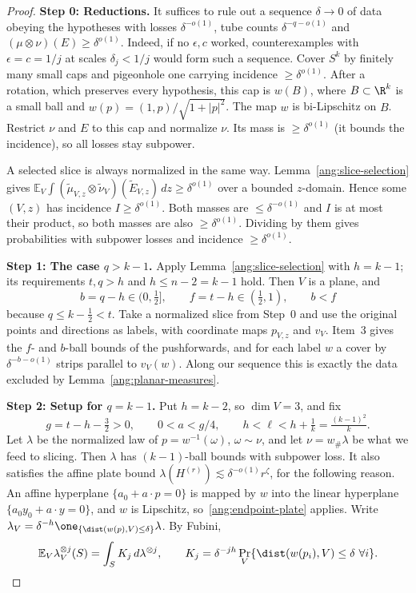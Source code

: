\documentclass[11pt,reqno]{amsart}
\begin{document}
\begin{proof}
\textbf{Step 0: Reductions.} It suffices to rule out a sequence $\delta\to0$ of data obeying the hypotheses with losses $\delta^{-o(1)}$, tube counts $\delta^{-q-o(1)}$ and $(\mu\otimes\nu)(E)\ge\delta^{o(1)}$. Indeed, if no $\epsilon,c$ worked, counterexamples with $\epsilon=c=1/j$ at scales $\delta_j<1/j$ would form such a sequence. Cover $S^k$ by finitely many small caps and pigeonhole one carrying incidence $\ge\delta^{o(1)}$. After a rotation, which preserves every hypothesis, this cap is $w(B)$, where $B\subset\R^k$ is a small ball and $w(p)=(1,p)/\sqrt{1+|p|^2}$. The map $w$ is bi-Lipschitz on $B$. Restrict $\nu$ and $E$ to this cap and normalize $\nu$. Its mass is $\ge\delta^{o(1)}$ (it bounds the incidence), so all losses stay subpower.

A selected slice is always normalized in the same way. Lemma~\ref{ang:slice-selection} gives $\mathbb E_V\int(\widetilde\mu_{V,z}\otimes\widetilde\nu_V)(\widetilde E_{V,z})\,dz\ge\delta^{o(1)}$ over a bounded $z$-domain. Hence some $(V,z)$ has incidence $I\ge\delta^{o(1)}$. Both masses are $\le\delta^{-o(1)}$ and $I$ is at most their product, so both masses are also $\ge\delta^{o(1)}$. Dividing by them gives probabilities with subpower losses and incidence $\ge\delta^{o(1)}$.

\textbf{Step 1: The case $q>k-1$.} Apply Lemma~\ref{ang:slice-selection} with $h=k-1$; its requirements $t,q>h$ and $h\le n-2=k-1$ hold. Then $V$ is a plane, and
\[
 b=q-h\in(0,\tfrac12],\qquad f=t-h\in(\tfrac12,1),\qquad b<f
\]
because $q\le k-\tfrac12<t$. Take a normalized slice from Step~0 and use the original points and directions as labels, with coordinate maps $p_{V,z}$ and $v_V$. Item~3 gives the $f$- and $b$-ball bounds of the pushforwards, and for each label $w$ a cover by $\delta^{-b-o(1)}$ strips parallel to $v_V(w)$. Along our sequence this is exactly the data excluded by Lemma~\ref{ang:planar-measures}.

\textbf{Step 2: Setup for $q=k-1$.} Put $h=k-2$, so $\dim V=3$, and fix
\[
 g=t-h-\tfrac32>0,\qquad 0<a<g/4,\qquad h<\ell<h+\tfrac1k=\tfrac{(k-1)^2}{k}.
\]
Let $\lambda$ be the normalized law of $p=w^{-1}(\omega)$, $\omega\sim\nu$, and let $\nu=w_\#\lambda$ be what we feed to slicing. Then $\lambda$ has $(k-1)$-ball bounds with subpower loss. It also satisfies the affine plate bound $\lambda(H^{(r)})\lesssim\delta^{-o(1)}r^\zeta$, for the following reason. An affine hyperplane $\{a_0+a\cdot p=0\}$ is mapped by $w$ into the linear hyperplane $\{a_0y_0+a\cdot y=0\}$, and $w$ is Lipschitz, so~\eqref{ang:endpoint-plate} applies. Write $\lambda_V=\delta^{-h}\one_{\{\dist(w(p),V)\le\delta\}}\lambda$. By Fubini,
\[
 \mathbb E_V\lambda_V^{\otimes j}(S)=\int_S K_j\,d\lambda^{\otimes j},\qquad
 K_j=\delta^{-jh}\Pr_V\{\dist(w(p_i),V)\le\delta\ \forall i\}.
\]


\end{proof}
\end{document}
